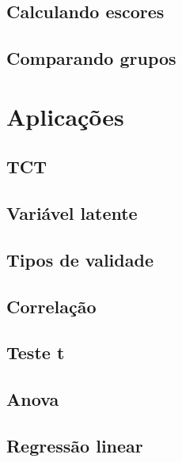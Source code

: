 \documentclass[
]{book}
\begin{document}
\hypertarget{calculando-escores}{%
\section{Calculando escores}\label{calculando-escores}}

\hypertarget{comparando-grupos}{%
\section{Comparando grupos}\label{comparando-grupos}}

\hypertarget{aplicacoes}{%
\chapter{Aplicações}\label{aplicacoes}}

\hypertarget{tct}{%
\section{TCT}\label{tct}}

\hypertarget{variuxe1vel-latente}{%
\section{Variável latente}\label{variuxe1vel-latente}}

\hypertarget{tipos-de-validade}{%
\section{Tipos de validade}\label{tipos-de-validade}}

\hypertarget{correlauxe7uxe3o}{%
\section{Correlação}\label{correlauxe7uxe3o}}

\hypertarget{teste-t}{%
\section{Teste t}\label{teste-t}}

\hypertarget{anova}{%
\section{Anova}\label{anova}}

\hypertarget{regressuxe3o-linear}{%
\section{Regressão linear}\label{regressuxe3o-linear}}
\end{document}
